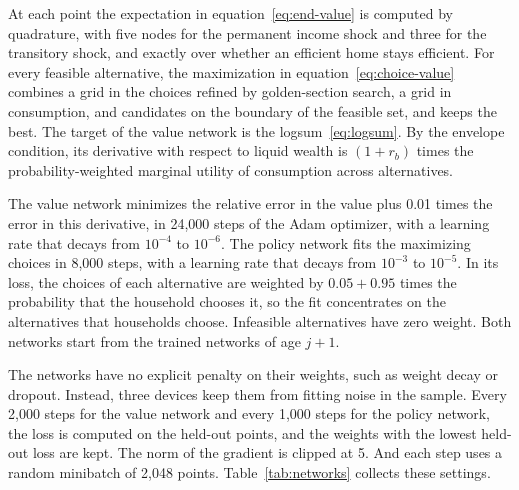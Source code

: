 At each point the expectation in equation~\eqref{eq:end-value} is computed
by quadrature, with five nodes for the permanent income shock and three for
the transitory shock, and exactly over whether an efficient home stays
efficient. For every feasible alternative, the maximization in
equation~\eqref{eq:choice-value} combines a grid in the choices refined by
golden-section search, a grid in consumption, and candidates on the
boundary of the feasible set, and keeps the best. The target of the value
network is the logsum~\eqref{eq:logsum}. By the envelope condition, its
derivative with respect to liquid wealth is $(1+r_b)$ times the
probability-weighted marginal utility of consumption across alternatives.

The value network minimizes the relative error in the value plus 0.01 times
the error in this derivative, in 24,000 steps of the Adam optimizer, with a
learning rate that decays from $10^{-4}$ to $10^{-6}$. The policy network
fits the maximizing choices in 8,000 steps, with a learning rate that
decays from $10^{-3}$ to $10^{-5}$. In its loss, the choices of each
alternative are weighted by $0.05+0.95$ times the probability that the
household chooses it, so the fit concentrates on the alternatives that
households choose. Infeasible alternatives have zero weight. Both networks
start from the trained networks of age $j+1$.

The networks have no explicit penalty on their weights, such as weight
decay or dropout. Instead, three devices keep them from fitting noise in
the sample. Every 2,000 steps for the value network and every 1,000 steps
for the policy network, the loss is computed on the held-out points, and
the weights with the lowest held-out loss are kept. The norm of the
gradient is clipped at 5. And each step uses a random minibatch of 2,048
points. Table~\ref{tab:networks} collects these settings.

